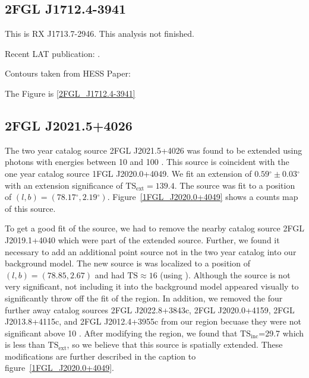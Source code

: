 \documentclass[12pt,preprint]{aastex}
\newcommand{\gev}{\text{GeV}\xspace}
\newcommand{\tsext}{{\ensuremath{\text{TS}_\text{ext}}}\xspace}
\newcommand{\tsinc}{\ensuremath{\text{TS}_\text{inc}}\xspace}
\newcommand{\ts}{\text{TS}\xspace}
\renewcommand{\deg}{\ensuremath{^\circ}\xspace}
\newcommand{\pointlike}{\text{\em pointlike}\xspace}
\begin{document}


\subsection{2FGL J1712.4-3941}
\label{section_2FGL_J1712.4-3941}


This is RX J1713.7-2946. This analysis not finished.

Recent LAT publication: \cite{rx_j1713_lat}.

Contours taken from HESS Paper: \cite{rx_j1713_hess}

The Figure is \ref{2FGL_J1712.4-3941}

\subsection{2FGL J2021.5+4026}
\label{section_2FGL J2021.5+4026}



The two year catalog source 2FGL J2021.5+4026 was found to be extended
using photons with energies between 10 \gev and 100 \gev. This source
is coincident with the one year catalog source 1FGL J2020.0+4049. We
fit an extension of $0.59\deg\pm0.03\deg$ with an extension
significance of $\tsext=139.4$.  The source was fit to a position of
$(l,b)=(78.17\deg,2.19\deg)$.  Figure~\ref{1FGL_J2020.0+4049} shows a
counts map of this source.

To get a good fit of the source, we had to remove the nearby catalog
source 2FGL J2019.1+4040 which were part of the extended source.
Further, we found it necessary to add an additional point source not in
the two year catalog into our background model.  The new source is was
localized to a position of $(l,b)=(78.85,2.67)$ and had $\ts\approx 16$
(using \pointlike).  Although the source is not very significant, not
including it into the background model appeared visually to significantly
throw off the fit of the region.  In addition, we removed the four
further away catalog sources 2FGL J2022.8+3843c, 2FGL J2020.0+4159,
2FGL J2013.8+4115c, and 2FGL J2012.4+3955c from our region becuase they
were not significant above 10 \gev.  After modifying the region, we found
that \tsinc=29.7 which is less than \tsext, so we believe that this
source is spatially extended.  These modifications are further described
in the caption to figure~\ref{1FGL_J2020.0+4049}.
\end{document}
